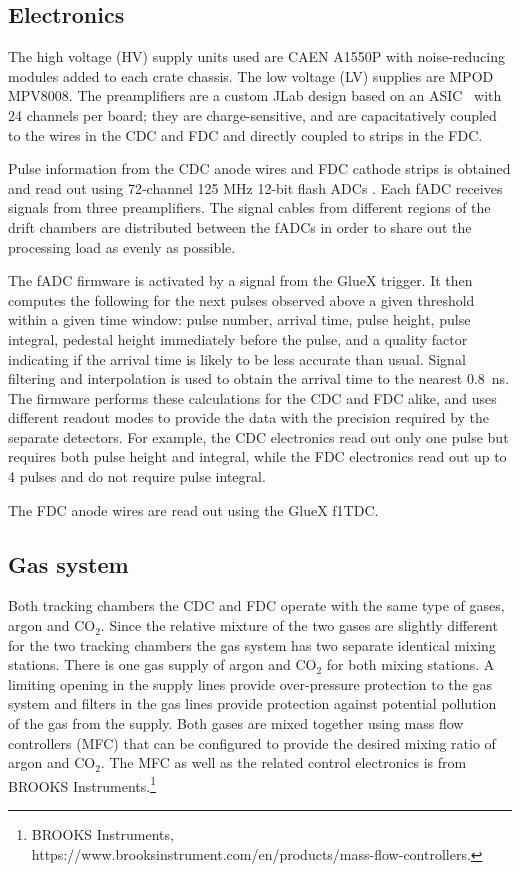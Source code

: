 \subsection{Electronics \label{sec:dcelectronics}}
The high voltage (HV) supply units used are CAEN A1550P with noise-reducing modules added to each crate chassis. 
The low voltage (LV) supplies are MPOD MPV8008. 
The preamplifiers are a custom JLab design based on an ASIC~\cite{hdnote2515}
with 24 channels per board; they are charge-sensitive, and are capacitatively coupled to the wires in the CDC and FDC and directly coupled to strips in the FDC. 

Pulse information from the CDC anode wires and FDC cathode strips is obtained and read out using 72-channel 125 MHz 12-bit flash ADCs \cite{Visser2008,5873864}. 
Each fADC receives signals from three preamplifiers. 
The signal cables from different regions of the drift chambers are distributed between the fADCs in order to share out the processing load as evenly as possible.  

The fADC firmware is activated by a signal from the GlueX trigger. It then computes the following for the next pulses observed above a given threshold within a given time window: pulse number, arrival time, pulse height, pulse integral, pedestal height immediately before the pulse, and a quality factor indicating if the arrival time is likely to be less accurate than usual. 
Signal filtering and interpolation is used to obtain the arrival time to the nearest 0.8~ns. 
The firmware performs these calculations for the CDC and FDC alike, and uses different readout modes to provide the data with the precision required by the separate detectors. 
For example, the CDC electronics read out only one pulse but requires both pulse height and integral, while the FDC electronics read out up to 4 pulses and do not require pulse integral.  

The FDC anode wires are read out using the GlueX f1TDC\cite{JLAB2002}. 

\subsection[Gas system (Beni)]{Gas system \label{sec:gas}}
Both tracking chambers the CDC and FDC operate with the same type of gases, argon and CO$_{2}$. Since the relative mixture of
the two gases are slightly different for the two tracking chambers the gas system has two separate identical mixing stations. There is one gas supply of argon and CO$_{2}$ for both mixing stations. A limiting opening in the supply
lines provide over-pressure protection to the gas system and filters in the gas lines provide protection against potential
pollution of the gas from the supply. Both gases are mixed together using mass flow controllers (MFC) that can be 
configured
to provide the desired mixing ratio of argon and CO$_{2}$.  The MFC as well as the related control electronics is from
BROOKS Instruments.\footnote{BROOKS Instruments, https://www.brooksinstrument.com/en/products/mass-flow-controllers.}

